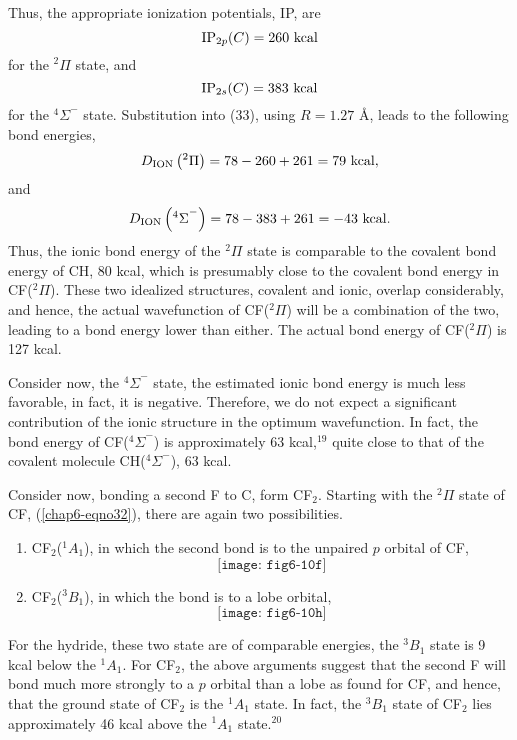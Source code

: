 Thus, the appropriate ionization potentials, IP, are
\begin{equation}
\mathrm{IP}_{2p} (C) = 260 ~ {\rm kcal}
\end{equation}
for the ${^2\Pi}$ state, and
\begin{equation}
\mathrm{IP}_{2s} (C) = 383 ~ {\rm kcal}
\end{equation}
for the ${^4\Sigma}^-$ state.  Substitution into (33), using $R = 
1.27$ \AA, leads to the following bond energies,
\begin{equation}
D_\mathrm{ION} \left( {^2\Pi} \right) = 78 - 260 + 261 
= 79 ~ {\rm kcal},
\end{equation}
and
\begin{equation}
D_\mathrm{ION} \left( {^4\Sigma}^- \right) = 78 - 383 + 261 
= - 43 ~ {\rm kcal}.
\end{equation}
Thus, the ionic bond energy of the ${^2\Pi}$ state is comparable to 
the covalent bond energy of CH, 80 kcal, which is presumably close to 
the covalent bond energy in CF(${^2\Pi}$).  These two idealized 
structures, covalent and ionic, overlap considerably, and hence, the 
actual wavefunction of CF(${^2\Pi}$) will be a combination of the 
two, leading to a bond energy lower than either.  The actual bond 
energy of CF(${^2\Pi}$) is 127 kcal.

Consider now, the ${^4\Sigma}^-$ state, the estimated ionic bond 
energy is much less favorable, in fact, it is negative.  Therefore, 
we do not expect a significant contribution of the ionic structure in 
the optimum wavefunction.  In fact, the bond energy of 
CF(${^4\Sigma}^-$) is approximately 63 kcal,$^{19}$ quite close to 
that of the covalent molecule CH(${^4\Sigma}^-$), 63 kcal.

Consider now, bonding a second F to C, form CF$_2$.  Starting with the
${^2\Pi}$ state of CF, (\ref{chap6-eqno32}), there are again two
possibilities.
\begin{enumerate}
\item CF$_2$(${^1A}_1$), in which the second bond is 
to the unpaired $p$ orbital of CF,
\begin{equation}
\texttt{[image: fig6-10f]}
\label{chap6-eqno34}
\end{equation}
\item CF$_2$(${^3B}_1$), in which the bond is to a lobe orbital,
\begin{equation}
\texttt{[image: fig6-10h]}
\end{equation}
\end{enumerate}
For the hydride, these two state are of comparable energies, the 
${^3B}_1$ state is 9 kcal below the ${^1A}_1$.  For CF$_2$, the above 
arguments suggest that the second F will bond much more strongly to a 
$p$ orbital than a lobe as found for CF, and hence, that the ground 
state of CF$_2$ is the  ${^1A}_1$ state.  In fact, the ${^3B}_1$ state 
of CF$_2$ lies approximately 46 kcal above the ${^1A}_1$ state.$^{20}$

